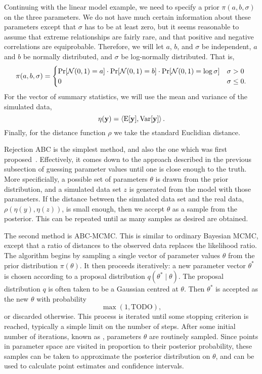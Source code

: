 Continuing with the linear model example, we need to specify a prior $\pi(a, b,
\sigma)$ on the three parameters. We do not have much certain information about
these parameters except that $\sigma$ has to be at least zero, but it seems
reasonable to assume that extreme relationships are fairly rare, and that
positive and negative correlations are equiprobable. Therefore, we will let
$a$, $b$, and $\sigma$ be independent, $a$ and $b$ be normally distributed,
and $\sigma$ be log-normally distributed. That is,
\[
  \pi(a, b, \sigma) = 
  \begin{cases}
    \Pr[\mathcal{N}(0, 1) = a] \cdot \Pr[\mathcal{N}(0, 1) = b] \cdot \Pr[\mathcal{N}(0, 1) = \log\sigma]
     & \sigma > 0 \\
    0 & \sigma \le 0.
  \end{cases}
\]
For the vector of summary statistics, we will use the mean and variance of the
simulated data,
\[
  \eta(\mathbf{y}) = \left<\operatorname{E}[\mathbf{y}], \operatorname{Var}[\mathbf{y}]\right>.
\]
Finally, for the distance function $\rho$ we take the standard Euclidian
distance.

Rejection ABC is the simplest method, and also the one which was first
proposed~\autocite{rubin1984bayesianly}. Effectively, it comes down to the
approach described in the previous subsection of guessing parameter values
until one is close enough to the truth. More specificially, a possible set of
parameters $\theta$ is drawn from the prior distribution, and a simulated data
set $z$ is generated from the model with those parameters. If the distance
between the simulated data set and the real data, $\rho(\eta(y), \eta(z))$, is
small enough, then we accept $\theta$ as a sample from the posterior. This can
be repeated until as many samples as desired are obtained.

The second method is \gls{ABC}-\gls{MCMC}. This is similar to ordinary Bayesian
\gls{MCMC}, except that a ratio of distances to the observed data replaces the
likelihood ratio. The algorithm begins by sampling a single vector of parameter
values $\theta$ from the prior distribution $\pi(\theta)$. It then proceeds
iteratively: a new parameter vector $\theta^*$ is chosen according to a
proposal distribution $q(\theta^* \mid \theta)$. The proposal distribution $q$
is often taken to be a Gaussian centred at $\theta$. Then $\theta^*$ is
accepted as the new $\theta$ with probability
\[
  \max\left(1, \text{TODO} \right),
\]
or discarded otherwise. This process is iterated until some stopping criterion
is reached, typically a simple limit on the number of steps. After some initial
number of iterations, known as , parameters $\theta$ are
routinely sampled. Since points in parameter space are visited in proportion to
their posterior probability, these samples can be taken to approximate the
posterior distribution on $\theta$, and can be used to calculate point
estimates and confidence intervals.

